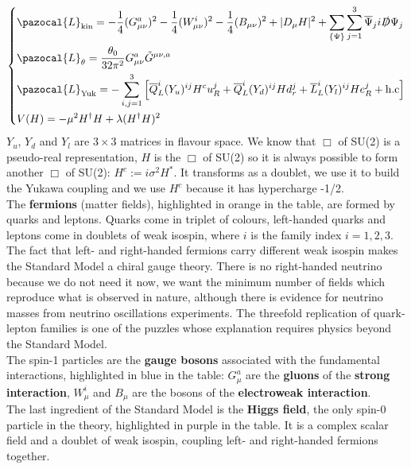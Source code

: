 \documentclass[../main.tex]{subfiles}
\begin{document}
    \[
    \left\{
    \begin{aligned}
    &\pazocal{L}_{\text{kin}}=-\frac{1}{4}(G_{\mu\nu}^a)^2-\frac{1}{4}(W_{\mu\nu}^i)^2-\frac{1}{4}(B_{\mu\nu})^2+|D_\mu H|^2+\sum_{\{\Psi\}}\sum_{j=1}^{3}\overline{\Psi}_ji\slashed{D}\Psi_j\\
    &\pazocal{L}_\theta=\frac{\theta_0}{32\pi^2}G_{\mu\nu}^a\Tilde{G}^{\mu\nu,a}\\
    &\pazocal{L}_{\text{Yuk}}=-\sum_{i,j=1}^3\left[\overline{Q}_L^i(Y_u)^{ij}H^cu_R^j+\overline{Q}_L^i(Y_d)^{ij}Hd_r^j+\overline{L}_L^i(Y_l)^{ij}He_R^j+\text{h.c}\right]\\
    &V(H)=-\mu^2H^\dagger H+\lambda(H^\dagger H)^2
    \end{aligned}
    \right.
    \]
$Y_u$, $Y_d$ and $Y_l$ are $3\times3$ matrices in flavour space. We know that $\Box$ of SU(2) is a pseudo-real representation, $H$ is the $\Box$ of SU(2) so it is always possible to form another $\Box$ of SU(2): $H^c:=i\sigma^2H^*$. It transforms as a doublet, we use it to build the Yukawa coupling and we use $H^c$ because it has hypercharge -1/2.\\
The \textbf{fermions} (matter fields), highlighted in orange in the table, are formed by quarks and leptons. Quarks come in triplet of colours, left-handed quarks and leptons come in doublets of weak isospin, where $i$ is the family index $i=1,2,3$. The fact that left- and right-handed fermions carry different weak isospin makes the Standard Model a chiral gauge theory. There is no right-handed neutrino because we do not need it now, we want the minimum number of fields which reproduce what is observed in nature, although there is evidence for neutrino masses from neutrino oscillations experiments. The threefold replication of quark-lepton families is one of the
puzzles whose explanation requires physics beyond the Standard Model.\\
The spin-1 particles are the \textbf{gauge bosons} associated with the fundamental interactions, highlighted in blue in the table: $G_\mu^a$ are the \textbf{gluons} of the \textbf{strong interaction}, $W_\mu^i$ and $B_\mu$ are the bosons of the \textbf{electroweak interaction}.\\
The last ingredient of the Standard Model is the \textbf{Higgs field}, the only spin-0 particle in the theory, highlighted in purple in the table. It is a complex scalar field and a doublet of weak isospin, coupling left- and right-handed fermions together.
\end{document}
